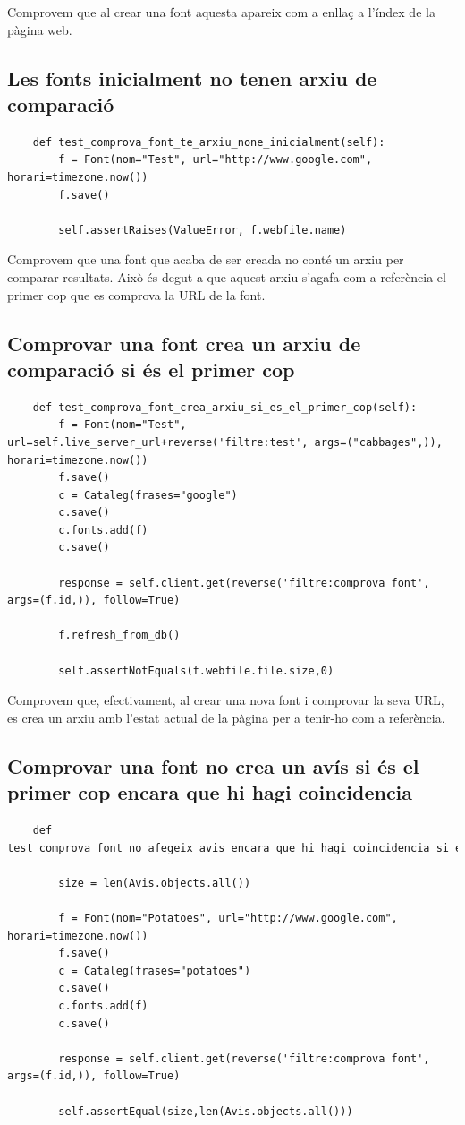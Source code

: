 \documentclass{article}
\begin{document}
Comprovem que al crear una font aquesta apareix com a enllaç a l'índex de la pàgina web.

\subsection{Les fonts inicialment no tenen arxiu de comparació}

\begin{lstlisting}
    def test_comprova_font_te_arxiu_none_inicialment(self):
        f = Font(nom="Test", url="http://www.google.com", horari=timezone.now())
        f.save()

        self.assertRaises(ValueError, f.webfile.name)
\end{lstlisting}

Comprovem que una font que acaba de ser creada no conté un arxiu per comparar resultats. Això és degut a que aquest arxiu s'agafa com a referència el primer cop que es comprova la URL de la font.

\subsection{Comprovar una font crea un arxiu de comparació si és el primer cop}

\begin{lstlisting}
    def test_comprova_font_crea_arxiu_si_es_el_primer_cop(self):
        f = Font(nom="Test", url=self.live_server_url+reverse('filtre:test', args=("cabbages",)), horari=timezone.now())
        f.save()
        c = Cataleg(frases="google")
        c.save()
        c.fonts.add(f)
        c.save()

        response = self.client.get(reverse('filtre:comprova font', args=(f.id,)), follow=True)

        f.refresh_from_db()

        self.assertNotEquals(f.webfile.file.size,0)
\end{lstlisting}

Comprovem que, efectivament, al crear una nova font i comprovar la seva URL, es crea un arxiu amb l'estat actual de la pàgina per a tenir-ho com a referència.


\subsection{Comprovar una font no crea un avís si és el primer cop encara que hi hagi coincidencia}

\begin{lstlisting}
    def test_comprova_font_no_afegeix_avis_encara_que_hi_hagi_coincidencia_si_es_el_primer_cop(self):

        size = len(Avis.objects.all())

        f = Font(nom="Potatoes", url="http://www.google.com", horari=timezone.now())
        f.save()
        c = Cataleg(frases="potatoes")
        c.save()
        c.fonts.add(f)
        c.save()

        response = self.client.get(reverse('filtre:comprova font', args=(f.id,)), follow=True)

        self.assertEqual(size,len(Avis.objects.all()))
\end{lstlisting}
\end{document}
